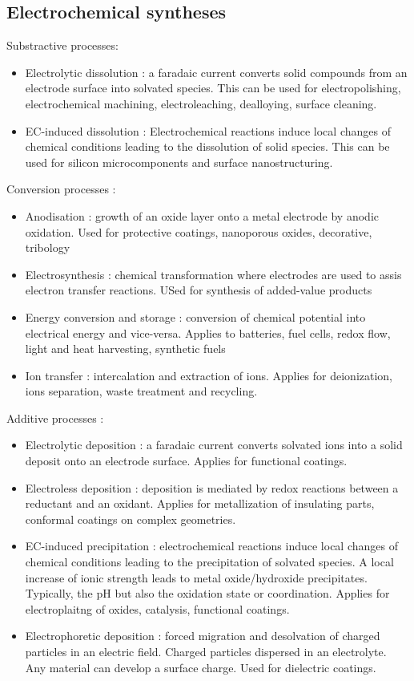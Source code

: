 \documentclass[../main.tex]{subfiles}
\begin{document}
\subsection{Electrochemical syntheses}
Substractive processes: 
\begin{itemize}
    \item Electrolytic dissolution : a faradaic current converts solid compounds from an electrode surface into solvated species. This can be used for electropolishing, electrochemical machining, electroleaching, dealloying, surface cleaning.
    \item EC-induced dissolution : Electrochemical reactions induce local changes of chemical conditions leading to the dissolution of solid species. This can be used for silicon microcomponents and surface nanostructuring. 
\end{itemize}

Conversion processes :
\begin{itemize}
    \item Anodisation : growth of an oxide layer onto a metal electrode by anodic oxidation. Used for protective coatings, nanoporous oxides, decorative, tribology
    \item Electrosynthesis : chemical transformation where electrodes are used to assis electron transfer reactions. USed for synthesis of added-value products
    \item Energy conversion and storage : conversion of chemical potential into electrical energy and vice-versa. Applies to batteries, fuel cells, redox flow, light and heat harvesting, synthetic fuels
    \item Ion transfer : intercalation and extraction of ions. Applies for deionization, ions separation, waste treatment and recycling.    
\end{itemize}

Additive processes :
\begin{itemize}
    \item Electrolytic deposition : a faradaic current converts solvated ions into a solid deposit onto an electrode surface. Applies for functional coatings.
    \item Electroless deposition : deposition is mediated by redox reactions between a reductant and an oxidant. Applies for metallization of insulating parts, conformal coatings on complex geometries.
    \item EC-induced precipitation : electrochemical reactions induce local changes of chemical conditions leading to the precipitation of solvated species. A local increase of ionic strength leads to metal oxide/hydroxide precipitates. Typically, the pH but also the oxidation state or coordination. Applies for electroplaitng of oxides, catalysis, functional coatings.
    \item Electrophoretic deposition : forced migration and desolvation of charged particles in an electric field. Charged particles dispersed in an electrolyte. Any material can develop a surface charge. Used for dielectric coatings. 
\end{itemize}
\end{document}
